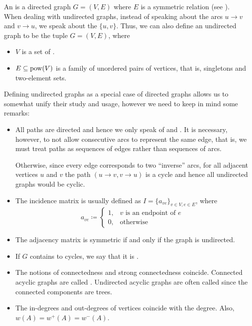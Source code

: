 \begin{definition}\label{def:undirected_graph}
  An  is a directed graph \( G = (V, E) \) where \( E \) is a symmetric relation (see ). When dealing with undirected graphs, instead of speaking about the arcs \( u \to v \) and \( v \to u \), we speak about the  \( \{ u, v \} \). Thus, we can also define an undirected graph to be the tuple \( G = (V, E) \), where
  \begin{itemize}
    \item \( V \) is a set of .
    \item \( E \subseteq \operatorname{pow}(V) \) is a family of unordered pairs of vertices, that is, singletons and two-element sets.
  \end{itemize}

  Defining undirected graphs as a special case of directed graphs allows us to somewhat unify their study and usage, however we need to keep in mind some remarks:
  \begin{itemize}
    \item All paths are directed and hence we only speak of  and . It is necessary, however, to not allow consecutive arcs to represent the same edge, that is, we must treat paths as sequences of edges rather than sequences of arcs.

          Otherwise, since every edge corresponds to two \enquote{inverse} arcs, for all adjacent vertices \( u \) and \( v \) the path \( (u \to v, v \to u) \) is a cycle and hence all undirected graphs would be cyclic.

    \item The incidence matrix is usually defined as \( I = \{ a_{ve} \}_{v \in V, e \in E} \), where
          \begin{equation*}
            a_{ve} \coloneqq \begin{cases}
              1, & v \text{ is an endpoint of } e \\
              0, & \text{otherwise}
            \end{cases}
          \end{equation*}

    \item The adjacency matrix is symmetric if and only if the graph is undirected.

    \item If \( G \) contains to cycles, we say that it is .

    \item The notions of connectedness and strong connectedness coincide. Connected acyclic graphs are called . Undirected acyclic graphs are often called  since the connected components are trees.

    \item The in-degrees and out-degrees of vertices coincide with the degree. Also, \( w(A) = w^+(A) = w^-(A) \).
  \end{itemize}
\end{definition}

